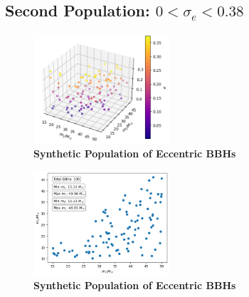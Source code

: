 \documentclass[twocolumn,prd,nofootinbib]{revtex4}
\begin{document}
\subsection{Second Population: $0<\sigma_e<0.38$}


\begin{figure}
\includegraphics[width=0.45\textwidth]{paper/figures/pop3d038.png}
\caption{\label{fig:population05}\textbf{Synthetic Population of Eccentric BBHs}}
\end{figure}

\begin{figure}
\includegraphics[width=0.45\textwidth]{paper/figures/pop2d038.png}
\caption{\label{fig:population05}\textbf{Synthetic Population of Eccentric BBHs}}
\end{figure}
\end{document}
